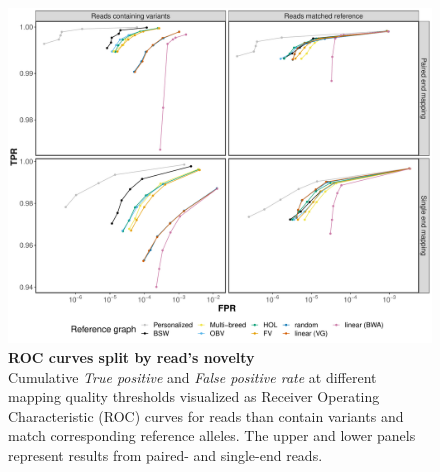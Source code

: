 \documentclass[../main.tex]{subfiles}
\begin{document}
\begin{flushleft}
\begin{figure}[!htb]
    \centering
    \includegraphics[width=\textwidth]{paper2/supplement/sp311.pdf}
    \caption[ROC curves split by read’s novelty]{\textbf{ROC curves split by read’s novelty} \\
    \small{Cumulative \emph{True positive} and \emph{False positive rate} at different mapping quality
    thresholds visualized as Receiver Operating Characteristic (ROC) curves for reads
    than contain variants and match corresponding reference alleles. The upper and
    lower panels represent results from paired- and single-end reads.}}
    \label{sup_fig:s311}
\end{figure}


\end{flushleft}
\end{document}
